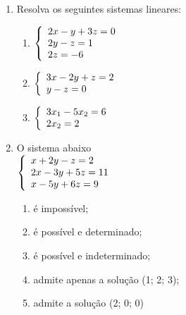 \documentclass[a4paper,12pt]{article}
\begin{document}
\begin{enumerate}


    \item Resolva os seguintes sistemas lineares:
    \begin{enumerate}
    \item
            $ 
\left\{
\begin{array}{ll}
\displaystyle 2x -y + 3z = 0 \\
\displaystyle 2y -z = 1\\
\displaystyle 2z = -6\\
\end{array}
\right.\\
$
   \\    
   
   \item 
       $ 
\left\{
\begin{array}{ll}
\displaystyle 3x -2y + z = 2 \\
\displaystyle y - z = 0\\
\end{array}
\right.\\
$
   \\    


   \item 
       $ 
\left\{
\begin{array}{ll}
\displaystyle 3x_1 - 5x_2 = 6 \\
\displaystyle 2x_2 = 2\\
\end{array}
\right.\\
$
   \\    
   \end{enumerate}


    \item O sistema abaixo \\
        $ 
\left\{
\begin{array}{ll}
\displaystyle x +2y - z = 2 \\
\displaystyle 2x -3y + 5z = 11\\
\displaystyle x -5y + 6z = 9\\
\end{array}
\right.\\
$
   \\    
   \begin{enumerate}
    \item é impossível;
    \item é possível e determinado;
    \item é possível e indeterminado;
    \item admite apenas a solução (1; 2; 3);
    \item admite a solução (2; 0; 0) 
    \end{enumerate}
    

\end{enumerate}
\end{document}
